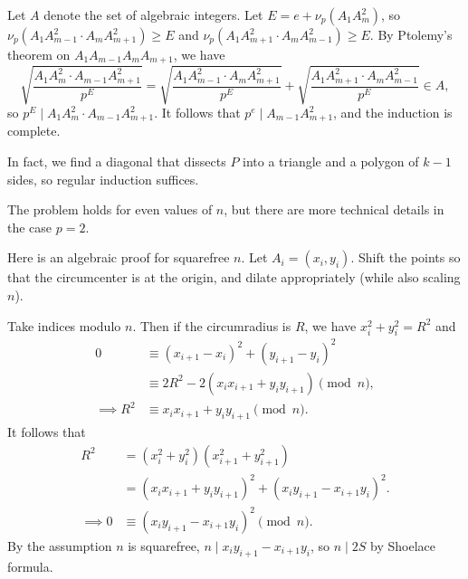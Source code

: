 Let $A$ denote the set of algebraic integers. Let $E=e+\nu_p\left(A_1A_m^2\right)$, so $\nu_p\left(A_1A_{m-1}^2\cdot A_mA_{m+1}^2\right)\ge E$ and $\nu_p\left(A_1A_{m+1}^2\cdot A_mA_{m-1}^2\right)\ge E$. By Ptolemy's theorem on $A_1A_{m-1}A_mA_{m+1}$, we have \[\sqrt{\frac{A_1A_m^2\cdot A_{m-1}A_{m+1}^2}{p^E}}=\sqrt{\frac{A_1A_{m-1}^2\cdot A_mA_{m+1}^2}{p^E}}+\sqrt{\frac{A_1A_{m+1}^2\cdot A_mA_{m-1}^2}{p^E}}\in A,\]
so $p^E\mid A_1A_m^2\cdot A_{m-1}A_{m+1}^2$. It follows that $p^e\mid A_{m-1}A_{m+1}^2$, and the induction is complete. 
\begin{remark}
    In fact, we find a diagonal that dissects $P$ into a triangle and a polygon of $k-1$ sides, so regular induction suffices.
\end{remark}
\begin{remark}
    The problem holds for even values of $n$, but there are more technical details in the case $p=2$.
\end{remark}
\begin{remark}
    Here is an algebraic proof for squarefree $n$. Let $A_i=(x_i,y_i)$. Shift the points so that the circumcenter is at the origin, and dilate appropriately (while also scaling $n$).

    Take indices modulo $n$. Then if the circumradius is $R$, we have $x_i^2+y_i^2=R^2$ and 
    \begin{align*}
        0&\equiv(x_{i+1}-x_i)^2+(y_{i+1}-y_i)^2\\
        &\equiv2R^2-2(x_ix_{i+1}+y_iy_{i+1})\pmod n,\\
        \implies R^2&\equiv x_ix_{i+1}+y_iy_{i+1}\pmod n.
    \end{align*}
    It follows that
    \begin{align*}
        R^2&=\left(x_i^2+y_i^2\right)\left(x_{i+1}^2+y_{i+1}^2\right)\\
        &=(x_ix_{i+1}+y_iy_{i+1})^2+(x_iy_{i+1}-x_{i+1}y_i)^2.\\
        \implies 0&\equiv(x_iy_{i+1}-x_{i+1}y_i)^2\pmod n.
    \end{align*}
    By the assumption $n$ is squarefree, $n\mid x_iy_{i+1}-x_{i+1}y_i$, so $n\mid2S$ by Shoelace formula.
\end{remark}

